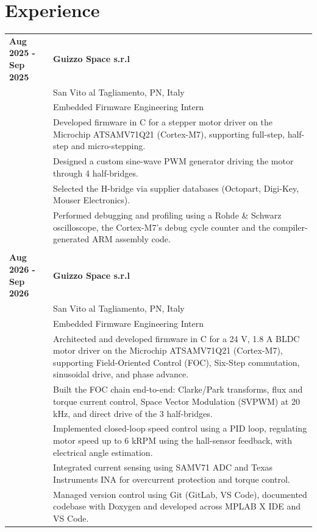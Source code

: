 \documentclass[
	11pt, %
]{resume} %
\begin{document}
\section*{Experience}
\begin{longtable}{@{} p{3.5cm} p{11.5cm} @{}}

\textbf{Aug 2025 -\newline Sep 2025} & \textbf{Guizzo Space s.r.l} \\
    & San Vito al Tagliamento, PN, Italy \\
    & Embedded Firmware Engineering Intern \\
    & \textbullet{} Developed firmware in C for a stepper motor driver on the Microchip ATSAMV71Q21 (Cortex-M7), supporting full-step, half-step and micro-stepping.\\
    & \textbullet{} Designed a custom sine-wave PWM generator driving the motor through 4 half-bridges.\\
    & \textbullet{} Selected the H-bridge via supplier databases (Octopart, Digi-Key, Mouser Electronics).\\
    & \textbullet{} Performed debugging and profiling using a Rohde \& Schwarz oscilloscope, the Cortex-M7's debug cycle counter and the compiler-generated ARM assembly code.\\

\multicolumn{2}{c}{} \\ %

\textbf{Aug 2026 -\newline Sep 2026} & \textbf{Guizzo Space s.r.l} \\
    & San Vito al Tagliamento, PN, Italy \\
    & Embedded Firmware Engineering Intern \\
    & \textbullet{} Architected and developed firmware in C for a 24 V, 1.8 A BLDC motor driver on the Microchip ATSAMV71Q21 (Cortex-M7), supporting Field-Oriented Control (FOC), Six-Step commutation, sinusoidal drive, and phase advance.\\
    & \textbullet{} Built the FOC chain end-to-end: Clarke/Park transforms, flux and torque current control, Space Vector Modulation (SVPWM) at 20 kHz, and direct drive of the 3 half-bridges.\\
    & \textbullet{} Implemented closed-loop speed control using a PID loop, regulating motor speed up to 6 kRPM using the hall-sensor feedback, with electrical angle estimation.\\
    & \textbullet{} Integrated current sensing using SAMV71 ADC and Texas Instruments INA for overcurrent protection and torque control.\\
    & \textbullet{} Managed version control using Git (GitLab, VS Code), documented codebase with Doxygen and developed across MPLAB X IDE and VS Code.\\

\end{longtable}
\end{document}
